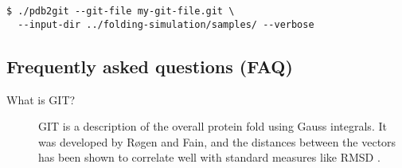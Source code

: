 \begin{verbatim}
$ ./pdb2git --git-file my-git-file.git \
  --input-dir ../folding-simulation/samples/ --verbose
\end{verbatim}


\subsection{Frequently asked questions (FAQ)}
\label{sec:faq-pdb2git}

\begin{description}
\item[What is GIT?] GIT is a description of the overall protein fold
  using Gauss integrals. It was developed by R{\o}gen and Fain, and
  the distances between the vectors has been shown to correlate well
  with standard measures like RMSD \cite{roegen2003automatic}.
\end{description}

